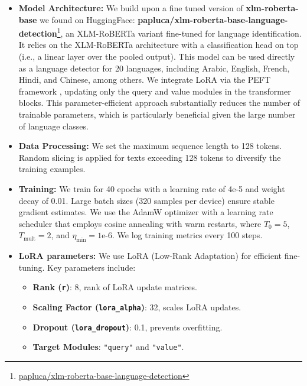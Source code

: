 \documentclass[11pt]{article}
\begin{document}
\begin{itemize}[leftmargin=*]
    \item \textbf{Model Architecture:} We build upon a fine tuned version of \textbf{xlm-roberta-base} we found on HuggingFace: \textbf{papluca/xlm-roberta-base-language-detection}\footnote{\href{https://huggingface.co/papluca/xlm-roberta-base-language-detection}{papluca/xlm-roberta-base-language-detection}}, an XLM-RoBERTa variant fine-tuned for language identification. It relies on the XLM-RoBERTa architecture \citep{conneau2020unsupervised} with a classification head on top (i.e., a linear layer over the pooled output). This model can be used directly as a language detector for 20 languages, including Arabic, English, French, Hindi, and Chinese, among others. We integrate LoRA \citep{hu2022lora} via the PEFT framework \citep{peft}, updating only the query and value modules in the transformer blocks. This parameter-efficient approach substantially reduces the number of trainable parameters, which is particularly beneficial given the large number of language classes.
    
   
    
    \item \textbf{Data Processing:} We set the maximum sequence length to 128 tokens. Random slicing is applied for texts exceeding 128 tokens to diversify the training examples.
    
    \item \textbf{Training:} We train for 40 epochs with a learning rate of 4e-5 and weight decay of 0.01. Large batch sizes (320 samples per device) ensure stable gradient estimates. We use the AdamW optimizer with a learning rate scheduler that employs cosine annealing with warm restarts, where \( T_0 = 5 \), \( T_{\text{mult}} = 2 \), and \( \eta_{\text{min}} = 1\text{e-6} \).  We log training metrics every 100 steps.
    
    \item \textbf{LoRA parameters:}
    We use LoRA (Low-Rank Adaptation) for efficient fine-tuning. Key parameters include:

    \begin{itemize}
        \item \textbf{Rank (\texttt{r})}: 8, rank of LoRA update matrices.
        \item \textbf{Scaling Factor (\texttt{lora\_alpha})}: 32, scales LoRA updates.
        \item \textbf{Dropout (\texttt{lora\_dropout})}: 0.1, prevents overfitting.
        \item \textbf{Target Modules}: \texttt{"query"} and \texttt{"value"}.
    \end{itemize}

    
\end{itemize}
\end{document}
